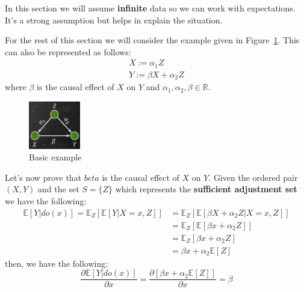 \begin{note}
    In this section we will assume \textbf{infinite} data so we can work with expectations.
    It's a strong assumption but helps in explain the situation.
\end{note}

For the rest of this section we will consider the example given in Figure~\ref{fig:example}.
This can also be represented as follows:
\begin{equation}
    \begin{array}{l}
        X := \alpha_1 Z \\ Y := \beta X + \alpha_2 Z
    \end{array}
\end{equation}
where $\beta$ is the causal effect of $X$ on $Y$ and $\alpha_1, \alpha_2, \beta \in \mathbb{R}$.
\begin{figure}[!ht]
    \centering
    \includegraphics[width=0.2\textwidth]{img/structural_causal_model/example.png}
    \caption{Basic example}
    \label{fig:example}
\end{figure}

Let's now prove that $ beta$ is the causal effect of $X$ on $Y$. Given the ordered
pair $(X, Y)$ and the set $S = \{Z\}$ which represents the \textbf{sufficient
    adjustment set} we have the following:
\begin{equation}
    \begin{array}{ll}
        \mathbb{E}[Y | do(x)] = \mathbb{E}_Z[\mathbb{E}[Y | X = x, Z]] & = \mathbb{E}_Z[\mathbb{E}[\beta X + \alpha_2 Z | X = x, Z]] \\
                                                                       & = \mathbb{E}_Z[\mathbb{E}[\beta x + \alpha_2 Z]]            \\
                                                                       & = \mathbb{E}_Z[\beta x + \alpha_2 Z]                        \\
                                                                       & = \beta x + \alpha_2\mathbb{E}[Z]
    \end{array}
\end{equation}
then, we have the following:
\begin{equation}
    \frac{\partial \mathbb{E}[Y |do(x)]}{\partial x} = \frac{\partial [\beta x + \alpha_2\mathbb{E}[Z]]}{\partial x} = \beta
\end{equation}

